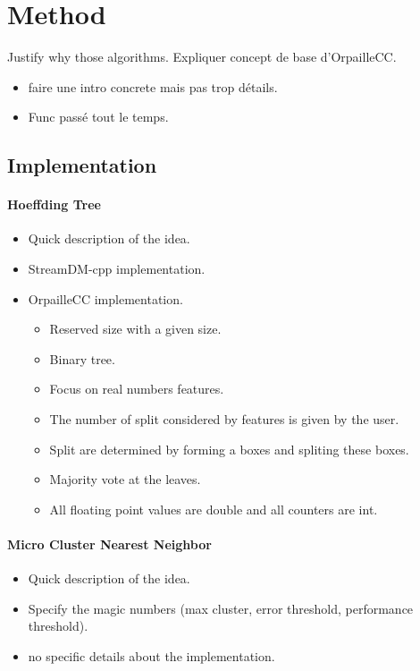 \section{Method}
Justify why those algorithms.
Expliquer concept de base d'OrpailleCC.
\begin{itemize}
	\item faire une intro concrete mais pas trop détails.
	\item Func passé tout le temps.
\end{itemize}

\subsection{Implementation}
\paragraph{Hoeffding Tree~\cite{VFDT}}
\begin{itemize}
	\item Quick description of the idea.
	\item StreamDM-cpp implementation.
	\item OrpailleCC implementation.
	\begin{itemize}
		\item Reserved size with a given size.
		\item Binary tree.
		\item Focus on real numbers features.
		\item The number of split considered by features is given by the user.
		\item Split are determined by forming a boxes and spliting these boxes.
		\item Majority vote at the leaves.
		\item All floating point values are double and all counters are int.
	\end{itemize}
\end{itemize}
\paragraph{Micro Cluster Nearest Neighbor~\cite{mc-nn}}
\begin{itemize}
	\item Quick description of the idea.
	\item Specify the magic numbers (max cluster, error threshold, performance threshold).
	\item no specific details about the implementation.
\end{itemize}
